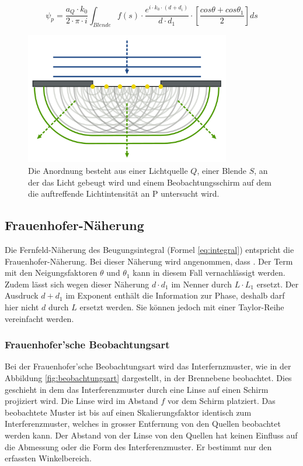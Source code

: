 \begin{equation}\label{eq:integral}
\psi_{p}=\frac{a_{Q}\cdot k_{0}}{2\cdot \pi \cdot i} \int_{Blende} f(s) \cdot\frac{e^{i\cdot k_{0}\cdot (d +d_{i})}}{d\cdot d_{1}} \cdot \left[ \frac{cos\theta + cos\theta_{1}}{2} \right] ds
\end{equation}

\begin{figure}[h!]
	\centering
	\includegraphics[width=0.8\textwidth]{data/hspalt.png}
	\caption{Die Anordnung besteht aus einer Lichtquelle $ Q $, einer Blende $ S $, an der das Licht gebeugt wird und einem Beobachtungsschirm auf dem die auftreffende Lichtintensität an P untersucht wird.}
	\label{fig:integral}
\end{figure}

\subsection{Frauenhofer-Näherung}
Die Fernfeld-Näherung des Beugungsintegral (Formel \ref{eq:integral}) entspricht die Frauenhofer-Näherung. Bei dieser Näherung wird angenommen, dass . Der Term mit den Neigungsfaktoren $ \theta $ und $ \theta_{1} $ kann in diesem Fall vernachlässigt werden. Zudem lässt sich wegen dieser Näherung $ d\cdot d_{1} $ im Nenner durch $ L\cdot L_{1} $ ersetzt. Der Ausdruck $ d + d_{1} $ im Exponent enthält die Information zur Phase, deshalb darf hier nicht $ d $ durch $ L $ ersetzt werden. Sie können jedoch mit einer Taylor-Reihe  vereinfacht werden. 


\subsubsection{Frauenhofer'sche Beobachtungsart}
Bei der Frauenhofer'sche Beobachtungsart wird das Interfernzmuster, wie in der Abbildung \ref{fig:beobachtungsart} dargestellt, in der Brennebene beobachtet. Dies geschieht in dem das Interferenzmuster durch eine Linse auf einen Schirm projiziert wird. Die Linse wird im Abstand $ f $ vor dem Schirm platziert. Das beobachtete Muster ist bis auf einen Skalierungsfaktor identisch zum Interferenzmuster, welches in grosser Entfernung von den Quellen beobachtet werden kann. Der Abstand von der Linse von den Quellen hat keinen Einfluss auf die Abmessung oder die Form des Interferenzmuster. Er bestimmt nur den erfassten Winkelbereich.

